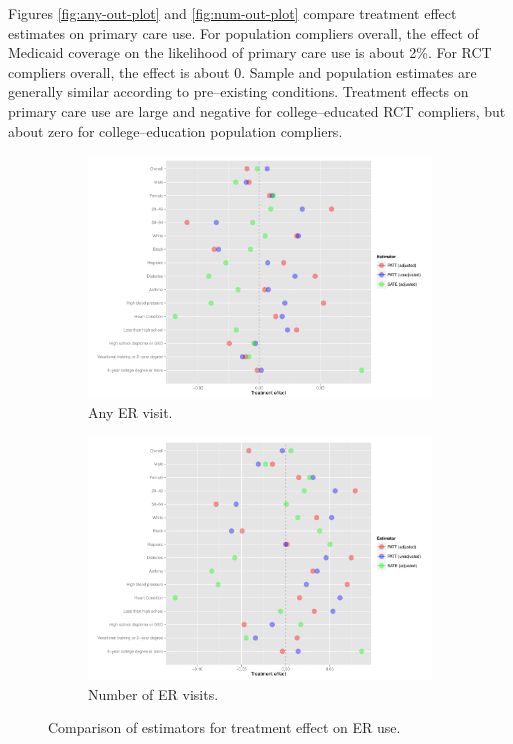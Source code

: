 \documentclass[12pt]{article}
\begin{document}
Figures \ref{fig:any-out-plot} and \ref{fig:num-out-plot} compare treatment effect estimates on primary care use. For population compliers overall, the effect of Medicaid coverage on the likelihood of primary care use is about 2\%. For RCT compliers overall, the effect is about 0. Sample and population estimates are generally similar according to pre--existing conditions. Treatment effects on primary care use are large and negative for college--educated RCT compliers, but about zero for college--education population compliers. 

\begin{figure} [b]
\begin{center}
  \begin{subfigure}[b]{0.86\textwidth}
    \includegraphics[width=\textwidth]{any-visit-plot.pdf}
    \caption{Any ER visit.}
    \label{fig:any-visit-plot}
  \end{subfigure}
  \begin{subfigure}[b]{0.86\textwidth}
    \includegraphics[width=\textwidth]{num-visit-plot.pdf}
    \caption{Number of ER visits.}
    \label{fig:num-visit-plot}
  \end{subfigure}
 \caption{Comparison of estimators for treatment effect on ER use.}
  \end{center}
\end{figure}
\end{document}
